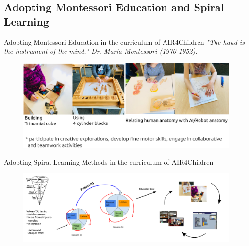 \subsection{Adopting Montessori Education and Spiral Learning}

{
\begin{frame}{Adopting Montessori Education in the curriculum of AIR4Children } 
  \vspace{3mm}
  \it{"The hand is the instrument of the mind."} Dr. Maria Montessori (1970-1952).
  \vspace{2mm}
    \begin{figure}
        \centering
        \includegraphics[width=1.0\textwidth]{./figures/montessori/versions/drawing-v00.png}
      \end{figure}
\end{frame}
}

{
\begin{frame}{Adopting Spiral Learning Methods in the curriculum of AIR4Children}

  \begin{figure}
        \centering
        \includegraphics[width=1.0\textwidth]{./figures/teaching-materials/versions/drawing-v02.png}
      \end{figure}
\end{frame}
}
